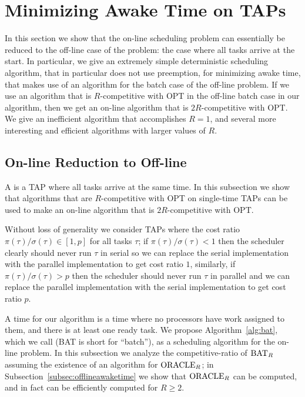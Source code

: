 \section{Minimizing Awake Time on TAPs} 
\label{sec:awaketime}
In this section we show that the on-line scheduling problem can
essentially be reduced to the off-line 
case of the problem: the case where all tasks arrive at the
start. In particular, we give an extremely simple deterministic
scheduling algorithm, that in particular does not use preemption,
for minimizing awake time, that makes use of an algorithm for the
batch case of the off-line problem. If we use an algorithm that
is $R$-competitive with OPT in the off-line batch case in our
algorithm, then we get an on-line algorithm that is
$2R$-competitive with OPT. We give an inefficient algorithm that
accomplishes $R=1$, and several more interesting and efficient
algorithms with larger values of $R$.

\subsection{On-line Reduction to Off-line}
A  is a TAP where all tasks arrive at the
same time. In this subsection we show that algorithms that are
$R$-competitive with OPT on single-time TAPs can be used to make
an on-line algorithm that is $2R$-competitive with OPT.

Without loss of generality we consider TAPs where the cost ratio
$\pi(\tau)/\sigma(\tau) \in [1,p]$ for all tasks $\tau$; if
$\pi(\tau)/\sigma(\tau) < 1$ then the scheduler clearly should
never run $\tau$ in serial so we can replace the serial
implementation with the parallel implementation to get cost ratio
$1$, similarly, if $\pi(\tau)/\sigma(\tau) > p$ then the
scheduler should never run $\tau$ in parallel and we can replace
the parallel implementation with the serial implementation to get
cost ratio $p$.

A  time for our algorithm is a time where no
processors have work assigned to them, and there is at least one
ready task. We propose Algorithm~\ref{alg:bat}, which we call
 (BAT is short for \enquote{batch}), as a
scheduling algorithm for the on-line problem. In this subsection
we analyze the competitive-ratio of $\operatorname{\text{BAT}}_R$ assuming the
existence of an algorithm for $\operatorname{\text{ORACLE}}_R$; in
Subsection~\ref{subsec:offlineawaketime} we show that $\operatorname{\text{ORACLE}}_R$
can be computed, and in fact can be efficiently computed for $R \ge 2$.

